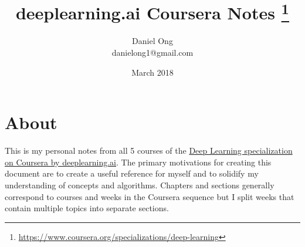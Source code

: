 \documentclass[11pt]{report}
\title{deeplearning.ai Coursera Notes \thanks{\url{https://www.coursera.org/specializations/deep-learning}}}
\author{Daniel Ong\\ danielong1@gmail.com}
\date{March 2018}
\begin{document}
\maketitle

\tableofcontents

\chapter*{About} 
This is my personal notes from all 5 courses of the \href{https://www.coursera.org/specializations/deep-learning}{Deep Learning specialization on Coursera by deeplearning.ai}. The primary motivations for creating this document are to create a useful reference for myself and to solidify my understanding of concepts and algorithms. Chapters and sections generally correspond to courses and weeks in the Coursera sequence but I split weeks that contain multiple topics into separate sections.















\end{document}
